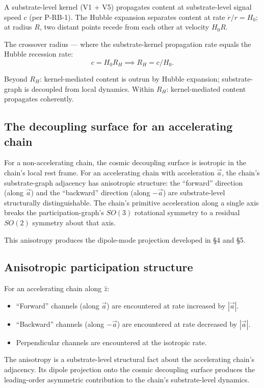 \documentclass[11pt,a4paper]{article}
\begin{document}
A substrate-level kernel (V1 + V5) propagates content at substrate-level signal speed $c$ (per P-RB-1). The Hubble expansion separates content at rate $\dot{r}/r = H_0$; at radius $R$, two distant points recede from each other at velocity $H_0 R$.

The crossover radius --- where the substrate-kernel propagation rate equals the Hubble recession rate:
\[
c = H_0 R_H \implies R_H = c/H_0.
\]

Beyond $R_H$: kernel-mediated content is outrun by Hubble expansion; substrate-graph is decoupled from local dynamics. Within $R_H$: kernel-mediated content propagates coherently.

\subsection{The decoupling surface for an accelerating chain}

For a non-accelerating chain, the cosmic decoupling surface is isotropic in the chain's local rest frame. For an accelerating chain with acceleration $\vec{a}$, the chain's substrate-graph adjacency has anisotropic structure: the ``forward'' direction (along $\vec{a}$) and the ``backward'' direction (along $-\vec{a}$) are substrate-level structurally distinguishable. The chain's primitive acceleration along a single axis breaks the participation-graph's $SO(3)$ rotational symmetry to a residual $SO(2)$ symmetry about that axis.

This anisotropy produces the dipole-mode projection developed in \S4 and \S5.

\subsection{Anisotropic participation structure}

For an accelerating chain along $\hat{z}$:
\begin{itemize}[noitemsep]
\item ``Forward'' channels (along $\vec{a}$) are encountered at rate increased by $|\vec{a}|$.
\item ``Backward'' channels (along $-\vec{a}$) are encountered at rate decreased by $|\vec{a}|$.
\item Perpendicular channels are encountered at the isotropic rate.
\end{itemize}

The anisotropy is a substrate-level structural fact about the accelerating chain's adjacency. Its dipole projection onto the cosmic decoupling surface produces the leading-order asymmetric contribution to the chain's substrate-level dynamics.
\end{document}
